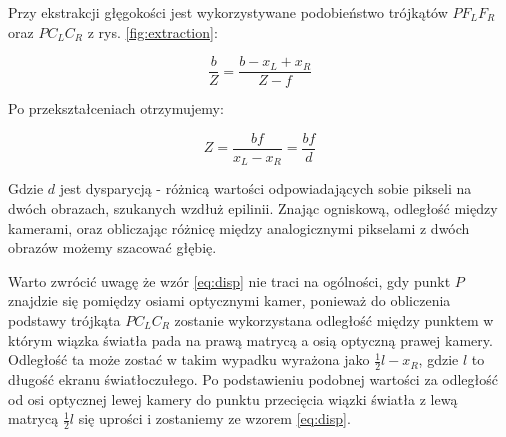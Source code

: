 \documentclass[oneside, eng]{mgr}
\begin{document}
Przy ekstrakcji głęgokości jest wykorzystywane podobieństwo trójkątów $P F_L F_R$ oraz $P C_L C_R$ z rys. \ref{fig:extraction}:

\begin{equation}
	\frac{b}{Z} = \frac{b-x_L+x_R}{Z-f}
	\label{eq:disp}
\end{equation}

Po przekształceniach otrzymujemy:

\begin{equation}
	Z = \frac{bf}{x_L-x_R} = \frac{bf}{d}
\end{equation}

Gdzie $d$ jest dysparycją - różnicą wartości odpowiadających sobie pikseli na dwóch obrazach, szukanych wzdłuż epilinii.
Znając ogniskową, odległość między kamerami, oraz obliczając różnicę między analogicznymi pikselami z dwóch obrazów możemy szacować głębię.

Warto zwrócić uwagę że wzór \ref{eq:disp} nie traci na ogólności, gdy punkt $P$ znajdzie się pomiędzy osiami optycznymi kamer, ponieważ do obliczenia podstawy trójkąta $P C_L C_R$ zostanie wykorzystana odległość między punktem w którym wiązka światła pada na prawą matrycą a osią optyczną prawej kamery. Odległość ta może zostać w takim wypadku wyrażona jako $\frac{1}{2}l-x_R$, gdzie $l$ to długość ekranu światłoczułego. Po podstawieniu podobnej wartości za odległość od osi optycznej lewej kamery do punktu przecięcia wiązki światła z lewą matrycą $\frac{1}{2}l$ się uprości i zostaniemy ze wzorem \ref{eq:disp}.
\end{document}
